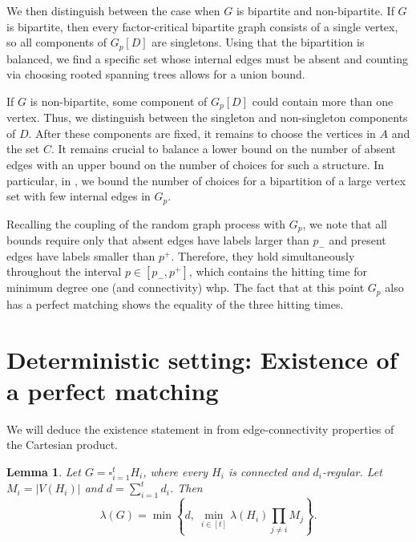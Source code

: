 \documentclass[notitlepage]{scrartcl}
\newtheorem{lemma}[thm]{Lemma}
\begin{document}
We then distinguish between the case when $G$ is bipartite and non-bipartite. If $G$ is bipartite, then every factor-critical bipartite graph consists of a single vertex, so all components of $G_p[D]$ are singletons. Using that the bipartition is balanced, we find a specific set whose internal edges must be absent and counting via choosing rooted spanning trees allows for a union bound.

If $G$ is non-bipartite, some component of $G_p[D]$ could contain more than one vertex. Thus, we distinguish between the singleton and non-singleton components of  $D$. After these components are fixed, it remains to choose the vertices in $A$ and the set $C$. %
It remains crucial to balance a lower bound on the number of absent edges with an upper bound on the number of choices for such a structure. In particular, in , we bound the number of choices for a bipartition of a large vertex set with few internal edges in $G_p$.

Recalling the coupling of the random graph process with $G_p$, we note that all bounds require only that absent edges have labels larger than $p_-$ and present edges have labels smaller than $p^+$. Therefore, they hold simultaneously throughout the interval $p \in [p_-, p^+]$, which contains the hitting time for minimum degree one (and connectivity) whp. The fact that at this point $G_p$ also has a perfect matching shows the equality of the three hitting times. 

\section{Deterministic setting: Existence of a perfect matching} \label{sec:deterministic-matching}

We will deduce the existence statement in  from edge-connectivity properties of the Cartesian product.

\begin{lemma}\label{lem:product-connectivity}
Let $G=\square_{i=1}^t H_i$, where every $H_i$ is connected and $d_i$-regular.
Let $M_i=|V(H_i)|$ and $d=\sum_{i=1}^t d_i$.
Then
\[
  \lambda(G)=
  \min\left\{d,\ \min_{i\in[t]}\lambda(H_i)\prod_{j\ne i}M_j\right\}.
\]
\end{lemma}
\end{document}
